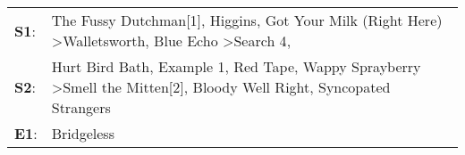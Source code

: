 \begin{supertabular}{p{0.03\textwidth}p{0.92\textwidth}}
 \textbf{S1}:  &      The Fussy Dutchman[1]\textsuperscript{}, \enspace Higgins\textsuperscript{}, \enspace Got Your Milk (Right Here)\textsuperscript{} \textgreater \enspace Walletsworth\textsuperscript{}, \enspace Blue Echo\textsuperscript{} \textgreater \enspace Search 4\textsuperscript{}, \textsuperscript{}  \enspace  \\
 \textbf{S2}:  &  Hurt Bird Bath\textsuperscript{}, \enspace Example 1\textsuperscript{}, \enspace Red Tape\textsuperscript{}, \enspace Wappy Sprayberry\textsuperscript{} \textgreater \enspace Smell the Mitten[2]\textsuperscript{}, \enspace Bloody Well Right\textsuperscript{}, \enspace Syncopated Strangers\textsuperscript{}  \enspace  \\
 \textbf{E1}:  &                                                                                                                                                                                                                                                                                         Bridgeless\textsuperscript{}  \enspace  \\
\end{supertabular}
